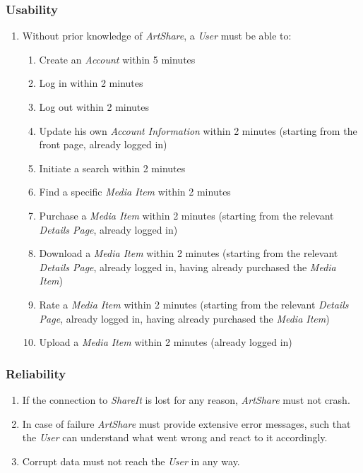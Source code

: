 \documentclass[../report.tex]{subfiles}
\begin{document}

\label{sec:Non-functional Requirements}

\subsubsection{Usability}

\begin{enumerate}[label=\textbf{NFR-\twodigits*}]
\item Without prior knowledge of \textit{ArtShare}, a \textit{User} must be able to:
	\begin{enumerate}
	\item Create an \textit{Account} within 5 minutes
	\item Log in within 2 minutes
	\item Log out within 2 minutes
	\item Update his own \textit{Account Information} within 2 minutes (starting from the front page, already logged in)
	\item Initiate a search within 2 minutes
	\item Find a specific \textit{Media Item} within 2 minutes
	\item Purchase a \textit{Media Item} within 2 minutes (starting from the relevant \textit{Details Page}, already logged in)
	\item Download a \textit{Media Item} within 2 minutes (starting from the relevant \textit{Details Page}, already logged in, having already purchased the \textit{Media Item})
	\item Rate a \textit{Media Item} within 2 minutes (starting from the relevant \textit{Details Page}, already logged in, having already purchased the \textit{Media Item})
	\item Upload a \textit{Media Item} within 2 minutes (already logged in)
	\end{enumerate}
\end{enumerate}

\subsubsection{Reliability}

\begin{enumerate}[label=\textbf{NFR-\twodigits*}, resume]
\item If the connection to \textit{ShareIt} is lost for any reason, \textit{ArtShare} must not crash. 
\item In case of failure \textit{ArtShare} must provide extensive error messages, such that the \textit{User} can understand what went wrong and react to it accordingly.
\item Corrupt data must not reach the \textit{User} in any way.
\end{enumerate}
\end{document}
